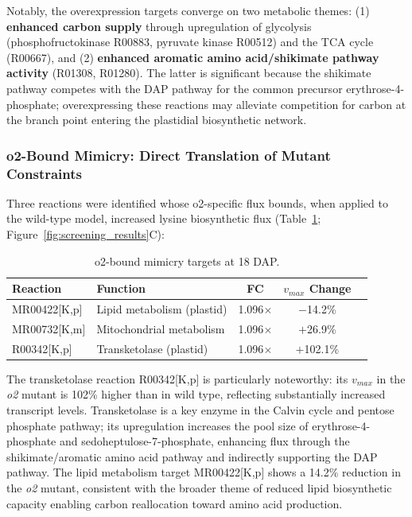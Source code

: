 Notably, the overexpression targets converge on two metabolic themes: (1) \textbf{enhanced carbon supply} through upregulation of glycolysis (phosphofructokinase R00883, pyruvate kinase R00512) and the TCA cycle (R00667), and (2) \textbf{enhanced aromatic amino acid/shikimate pathway activity} (R01308, R01280). The latter is significant because the shikimate pathway competes with the DAP pathway for the common precursor erythrose-4-phosphate; overexpressing these reactions may alleviate competition for carbon at the branch point entering the plastidial biosynthetic network.

\subsubsection{o2-Bound Mimicry: Direct Translation of Mutant Constraints}

Three reactions were identified whose o2-specific flux bounds, when applied to the wild-type model, increased lysine biosynthetic flux (Table~\ref{tab:mim_targets}; Figure~\ref{fig:screening_results}C):

\begin{table}[H]
\centering
\caption{o2-bound mimicry targets at 18 DAP.}
\label{tab:mim_targets}
\small
\begin{tabular}{llccc}
\toprule
Reaction & Function & FC & $v_{max}$ Change \\
\midrule
MR00422[K,p] & Lipid metabolism (plastid) & 1.096$\times$ & $-$14.2\% \\
MR00732[K,m] & Mitochondrial metabolism & 1.096$\times$ & $+$26.9\% \\
R00342[K,p] & Transketolase (plastid) & 1.096$\times$ & $+$102.1\% \\
\bottomrule
\end{tabular}
\end{table}

The transketolase reaction R00342[K,p] is particularly noteworthy: its $v_{max}$ in the \textit{o2} mutant is 102\% higher than in wild type, reflecting substantially increased transcript levels. Transketolase is a key enzyme in the Calvin cycle and pentose phosphate pathway; its upregulation increases the pool size of erythrose-4-phosphate and sedoheptulose-7-phosphate, enhancing flux through the shikimate/aromatic amino acid pathway and indirectly supporting the DAP pathway. The lipid metabolism target MR00422[K,p] shows a 14.2\% reduction in the \textit{o2} mutant, consistent with the broader theme of reduced lipid biosynthetic capacity enabling carbon reallocation toward amino acid production.


